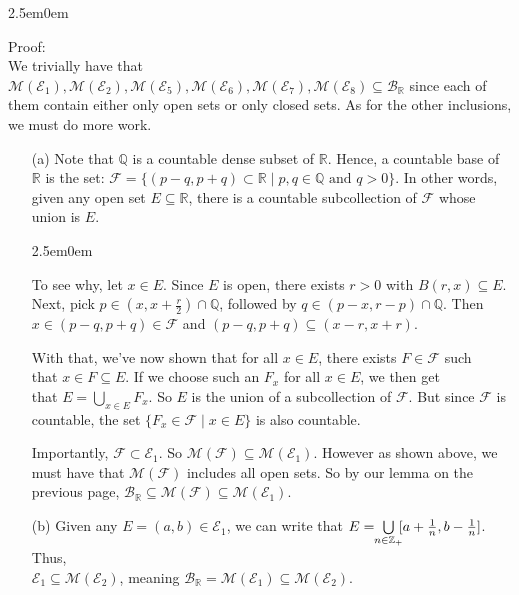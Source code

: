 \documentclass{book}
\newcommand{\exTwoP}{%
   \color{RedViolet}%
   \fontsize{13}{15}\selectfont%
}
\newcommand{\exPPP}{%
   \color{VioletRed}%
   \fontsize{12}{14}\selectfont%
}
\newenvironment{myIndent}{%
   \begin{adjustwidth}{2.5em}{0em}%
}{%
   \end{adjustwidth}%
}
\newcommand{\retTwo}{\hfill\bigbreak}
\begin{document}
\begin{myIndent}\exTwoP
   Proof:\\
   We trivially have that $\mathcal{M}(\mathcal{E}_1), \mathcal{M}(\mathcal{E}_2), \mathcal{M}(\mathcal{E}_5), \mathcal{M}(\mathcal{E}_6), \mathcal{M}(\mathcal{E}_7), \mathcal{M}(\mathcal{E}_8) \subseteq \mathcal{B}_{\mathbb{R}}$ since each of them contain either only open sets or only closed sets. As for the other inclusions, we must do more work.\newpage

   \begin{itemize}
      \item[(a)] Note that $\mathbb{Q}$ is a countable dense subset of $\mathbb{R}$. Hence, a countable base of $\mathbb{R}$ is the set: $\mathcal{F} = \{(p - q, p + q) \subset \mathbb{R} \mid p, q \in \mathbb{Q} \text{ and } q > 0\}$. In other words, given any open set $E \subseteq \mathbb{R}$, there is a countable subcollection of $\mathcal{F}$ whose union is $E$.
      \begin{myIndent}\exPPP
         To see why, let $x \in E$. Since $E$ is open, there exists $r > 0$ with $B(r, x) \subseteq E$.\\ Next, pick $p \in (x, x + \frac{r}{2}) \cap \mathbb{Q}$, followed by $q \in (p - x, r - p) \cap \mathbb{Q}$. Then $x \in (p - q, p + q) \in \mathcal{F}$ and $(p - q, p + q) \subseteq (x - r, x + r)$.\retTwo
   
         With that, we've now shown that for all $x \in E$, there exists $F \in \mathcal{F}$ such\\ that $x \in F \subseteq E$. If we choose such an $F_x$ for all $x \in E$, we then get\\ that $E = \bigcup\limits_{x \in E}F_x$. So $E$ is the union of a subcollection of $\mathcal{F}$. But since $\mathcal{F}$ is\\ [-9pt]\phantom{aaaaaaaaaaaaaaa} countable, the set $\{F_x \in \mathcal{F} \mid x \in E\}$ is also countable.\retTwo
      \end{myIndent}
   
      Importantly, $\mathcal{F} \subset \mathcal{E}_1$. So $\mathcal{M}(\mathcal{F}) \subseteq \mathcal{M}(\mathcal{E}_1)$. However as shown above, we\\ must have that $\mathcal{M}(\mathcal{F})$ includes all open sets. So by our lemma on the previous page, $\mathcal{B}_{\mathbb{R}} \subseteq \mathcal{M}(\mathcal{F}) \subseteq \mathcal{M}(\mathcal{E}_1)$.\retTwo

      \item[(b)] Given any $E = (a, b) \in \mathcal{E}_1$, we can write that $E = \hspace{-0.3em}\bigcup\limits_{n \in \mathbb{Z}_+}\hspace{-0.3em} [a+\frac{1}{n}, b - \frac{1}{n}]$. Thus,\\ [-10pt] $\mathcal{E}_1 \subseteq \mathcal{M}(\mathcal{E}_2)$, meaning $\mathcal{B}_\mathbb{R} = \mathcal{M}(\mathcal{E}_1) \subseteq \mathcal{M}(\mathcal{E}_2)$.\retTwo
      

\end{itemize}
\end{myIndent}
\end{document}
